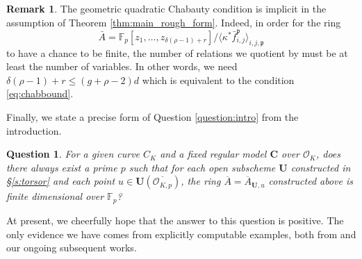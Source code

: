 \documentclass[11pt,oneside]{amsart}
\theoremstyle{plain}
\newtheorem{question}[theorem]{Question}
\theoremstyle{definition}
\newtheorem{remark}[theorem]{Remark}
\def\fp{\mathfrak{p}}
\def\F{\mathbb{F}}
\def\CC{\mathbf{C}}
\def\U{\mathbf{U}}
\def\oh{\mathcal{O}}
\begin{document}
\begin{remark}
The geometric quadratic Chabauty condition is implicit in the assumption of Theorem \ref{thm:main_rough_form}. Indeed, in order for the ring 
\[
\bar{A}=\F_p[z_1, \ldots, z_{\delta(\rho-1)+r}]/\langle \kappa^* \bar{f}_{i, j}^{\fp} \rangle_{i, j, \fp}
\]
to have a chance to be finite, the number of relations we quotient by must be at least the number of variables. In other words, we need $\delta(\rho-1)+r\leq (g+\rho-2)d$ which is equivalent to the condition \eqref{eq:chabbound}.
\end{remark}

Finally, we state a precise form of Question \ref{question:intro} from the introduction. 

\begin{question} 
For a given curve $C_K$ and a fixed regular model $\CC$ over $\oh_K$, does there always exist a prime $p$ such that for each open subscheme $\U$ constructed in \S \ref{s:torsor} and each point $u \in \U (\overline{\oh_{K, p}})$, the ring $\overline A = \overline A_{\U, u}$ constructed above is finite dimensional over $\F_p$? 
\end{question}

At present, we cheerfully hope that the answer to this question is positive. The only evidence we have comes from explicitly computable examples, both from \cite{EL19} and our ongoing subsequent works. 





\end{document}
